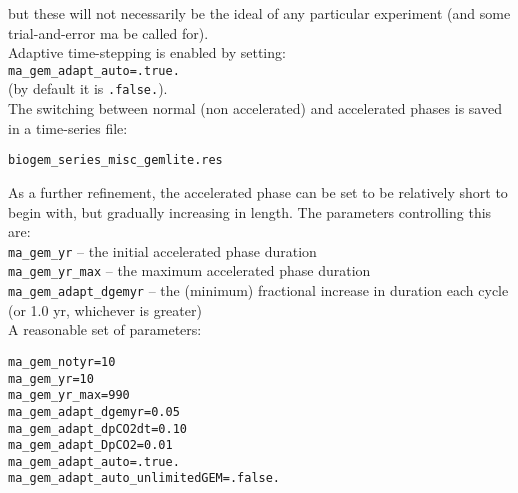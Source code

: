 \documentclass[10pt,twoside]{article}
\begin{document}
\begin{compactenum}
but these will not necessarily be the ideal of any particular experiment (and some trial-and-error ma be called for).
\\Adaptive time-stepping is enabled by setting:
\\\texttt{ma\_gem\_adapt\_auto=.true.}
\\(by default it is \texttt{.false.}).
\\The switching between normal (non accelerated) and accelerated phases is saved in a time-series file:
\vspace{-5pt}\begin{verbatim}biogem_series_misc_gemlite.res\end{verbatim}\vspace{-5pt}

As a further refinement, the accelerated phase can be set to be relatively short to begin with, but gradually increasing in length. The parameters controlling this are:
\\\texttt{ma\_gem\_yr} -- the initial accelerated phase duration
\\\texttt{ma\_gem\_yr\_max} -- the maximum accelerated phase duration
\\\texttt{ma\_gem\_adapt\_dgemyr} -- the (minimum) fractional increase in duration each cycle (or 1.0 yr, whichever is greater)
\\ A reasonable set of parameters:
\vspace{-5pt}\begin{verbatim}
ma_gem_notyr=10
ma_gem_yr=10
ma_gem_yr_max=990
ma_gem_adapt_dgemyr=0.05
ma_gem_adapt_dpCO2dt=0.10
ma_gem_adapt_DpCO2=0.01
ma_gem_adapt_auto=.true.
ma_gem_adapt_auto_unlimitedGEM=.false.
\end{verbatim}\vspace{-5pt}
        
\end{compactenum}
\end{document}
